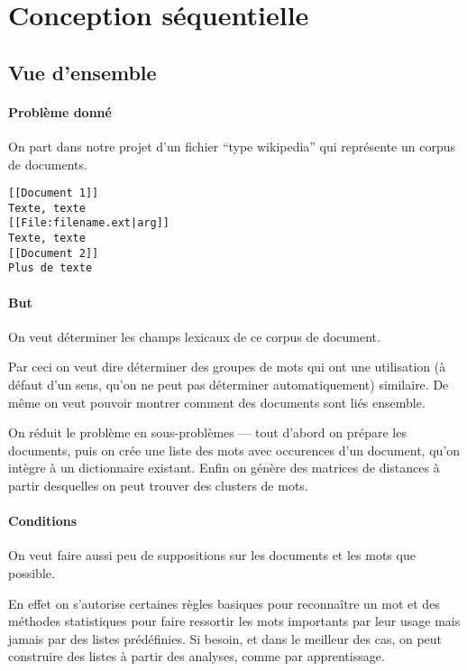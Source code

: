 \section{Conception séquentielle}

\subsection{Vue d'ensemble}

\paragraph{Problème donné}

On part dans notre projet d'un fichier
``type wikipedia'' qui représente un corpus de documents.
\begin{addmargin}{.5cm}
\begin{verbatim}
[[Document 1]]
Texte, texte
[[File:filename.ext|arg]]
Texte, texte
[[Document 2]]
Plus de texte
\end{verbatim}
\end{addmargin}

\paragraph{But}

On veut déterminer les champs lexicaux de ce corpus de document.

Par ceci on veut dire déterminer des groupes de mots
qui ont une utilisation (à défaut d'un sens, qu'on ne
peut pas déterminer automatiquement) similaire.
De même on veut pouvoir montrer comment des documents
sont liés ensemble.

On réduit le problème en sous-problèmes \----
tout d'abord on prépare les documents,
puis on crée une liste des mots avec occurences
d'un document, qu'on intègre à un dictionnaire existant.
Enfin on génère des matrices de distances à partir
desquelles on peut trouver des clusters de mots.

\paragraph{Conditions}

On veut faire aussi peu de suppositions sur les
documents et les mots que possible.

En effet on s'autorise certaines règles basiques pour
reconnaître un mot et des méthodes statistiques pour
faire ressortir les mots importants par leur usage
mais jamais par des listes prédéfinies.
Si besoin, et dans le meilleur des cas, on peut construire
des listes à partir des analyses, comme par apprentissage.

